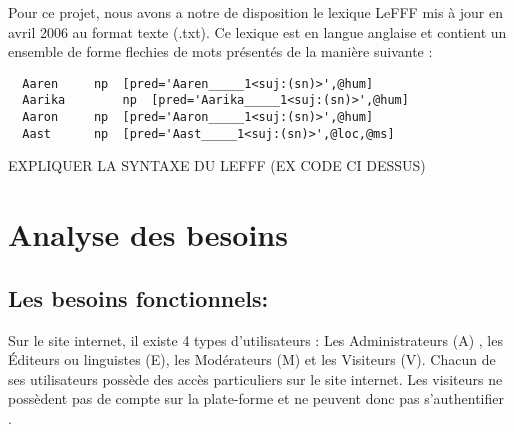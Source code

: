 \documentclass[12pt,a4paper]{article}
\begin{document}
Pour ce projet, nous avons a notre de disposition le lexique LeFFF mis à jour en avril 2006 au format texte (.txt).
Ce lexique est en langue anglaise et contient un ensemble de forme flechies de mots présentés de la manière suivante :
\begin{verbatim}
  Aaren		np	[pred='Aaren_____1<suj:(sn)>',@hum]
  Aarika		np	[pred='Aarika_____1<suj:(sn)>',@hum]
  Aaron		np	[pred='Aaron_____1<suj:(sn)>',@hum]
  Aast		np	[pred='Aast_____1<suj:(sn)>',@loc,@ms]
\end{verbatim}

EXPLIQUER LA SYNTAXE DU LEFFF (EX CODE CI DESSUS)

\section{Analyse des besoins}

\subsection{Les besoins fonctionnels:}

Sur le site internet, il existe 4 types d’utilisateurs : Les Administrateurs (A) , les Éditeurs ou linguistes (E), les Modérateurs (M) et les Visiteurs (V).
Chacun de ses utilisateurs possède des accès particuliers sur le site internet.
Les visiteurs ne possèdent pas de compte sur la plate-forme et ne peuvent donc pas s'authentifier . 
\end{document}
